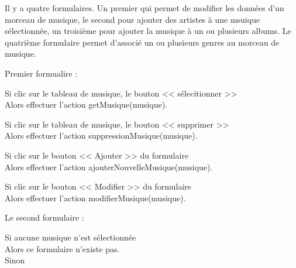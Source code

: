 
			\begin{paragraphe}
				Il y a quatre formulaires. Un premier qui permet de modifier les données d'un morceau de musique, le second pour ajouter des artistes à une msuique sélectionnée, un troisième pour ajouter la musique à un ou plusieurs albums. Le quatrième formulaire permet d'associé un ou plusieurs genres au morceau de musique.
			\end{paragraphe}

			\begin{paragraphe}
				Premier formualire :
			\end{paragraphe}

			\begin{paragraphe}
				Si clic sur le tableau de musique, le bouton << sélecitionner >> \\
				Alors effectuer l'action getMusique(musique).
			\end{paragraphe}

			\begin{paragraphe}
				Si clic sur le tableau de musique, le bouton << supprimer >> \\
				Alors effectuer l'action suppressionMusique(musique).
			\end{paragraphe}

			\begin{paragraphe}
				Si clic sur le bouton << Ajouter >> du formulaire \\
				Alors effectuer l'action ajouterNouvelleMusique(musique).
			\end{paragraphe}

			\begin{paragraphe}
				Si clic sur le bouton << Modifier >> du formulaire \\
				Alors effectuer l'action modifierMusique(musique).
			\end{paragraphe}

			\begin{paragraphe}
				Le second formulaire :
			\end{paragraphe}

			\begin{paragraphe}
				Si aucune musique n'est sélectionnée \\
				Alors ce formulaire n'existe pas. \\
				Sinon
			\end{paragraphe}

